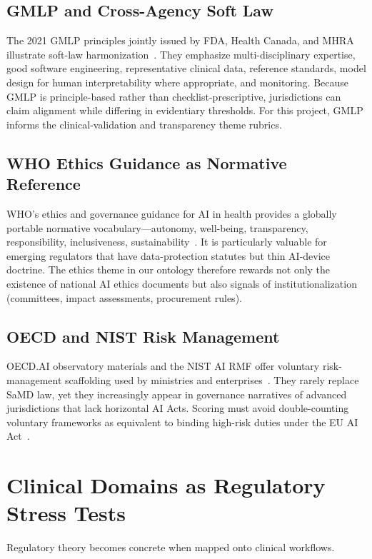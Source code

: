 \subsection{GMLP and Cross-Agency Soft Law}
The 2021 GMLP principles jointly issued by FDA, Health Canada, and MHRA illustrate soft-law harmonization~\cite{gmlp2021}. They emphasize multi-disciplinary expertise, good software engineering, representative clinical data, reference standards, model design for human interpretability where appropriate, and monitoring. Because GMLP is principle-based rather than checklist-prescriptive, jurisdictions can claim alignment while differing in evidentiary thresholds. For this project, GMLP informs the clinical-validation and transparency theme rubrics.

\subsection{WHO Ethics Guidance as Normative Reference}
WHO's ethics and governance guidance for AI in health provides a globally portable normative vocabulary---autonomy, well-being, transparency, responsibility, inclusiveness, sustainability~\cite{who2021}. It is particularly valuable for emerging regulators that have data-protection statutes but thin AI-device doctrine. The ethics theme in our ontology therefore rewards not only the existence of national AI ethics documents but also signals of institutionalization (committees, impact assessments, procurement rules).

\subsection{OECD and NIST Risk Management}
OECD.AI observatory materials and the NIST AI RMF offer voluntary risk-management scaffolding used by ministries and enterprises~\cite{oecdai,nistairmf}. They rarely replace SaMD law, yet they increasingly appear in governance narratives of advanced jurisdictions that lack horizontal AI Acts. Scoring must avoid double-counting voluntary frameworks as equivalent to binding high-risk duties under the EU AI Act~\cite{euaiact2024}.

\section{Clinical Domains as Regulatory Stress Tests}
\label{sec:domains}

Regulatory theory becomes concrete when mapped onto clinical workflows.

